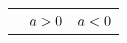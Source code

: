    
    \setlength\mytableroom{\mytablewidth}
    \addtolength\mytableroom{-\mytablespace}
    
    \setlength\myfixedwidth{0pt}
    \setlength\mystarwidth{\mytableroom}
        \addtolength\mystarwidth{-\myfixedwidth}
        \divide{}
        
    
            
    
        \begin{center}
      
      \label{m39341*uid151}
      
    \noindent
      \tablelasttail{}
      \begin{xtabular*}{\mytablewidth}[t]{|p{10\mystarwidth}|p{10\mystarwidth}|p{10\mystarwidth}|}\hline
    
    
         &
    
    
        
                  \begin{math}a>{}0\end{math}
                 &
    
    
        
                  \begin{math}a<{}0\end{math}
     \tabularnewline{}
    

\end{xtabular*}
\end{center}
